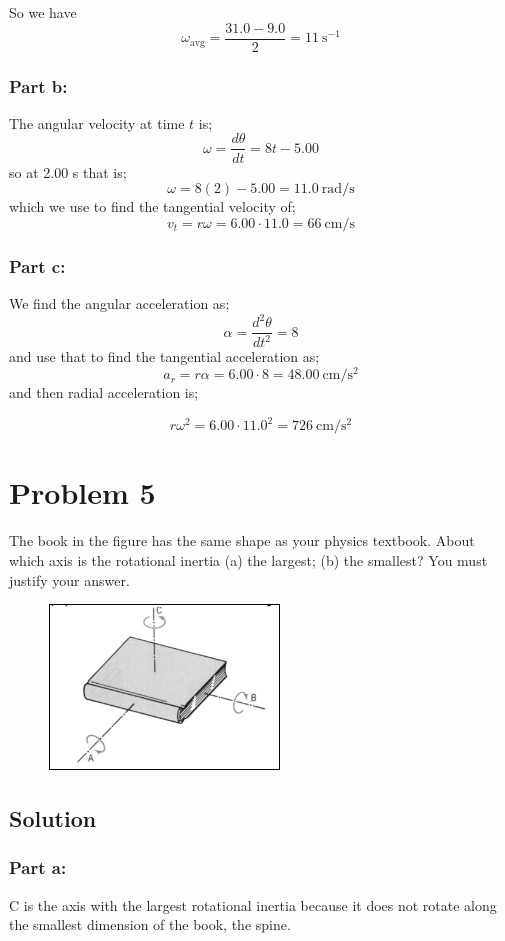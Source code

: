 \documentclass{article}
\begin{document}
So we have
\[
	\omega_\text{avg} = \frac{31.0-9.0}{2} = \boxed{11\ \text{s}^{-1}}
\]

\subsubsection*{Part b:}
The angular velocity at time $t$ is;
\[
	\omega = \frac{d\theta}{dt} = 8t - 5.00
\]
so at 2.00 s that is;
\[
	\omega = 8(2)-5.00 = 11.0\ \text{rad}/\text{s}
\]
which we use to find the tangential velocity of;
\[
	v_t = r \omega = 6.00 \cdot 11.0 = \boxed{66\ \text{cm}/\text{s}}
\]

\subsubsection*{Part c:}
We find the angular acceleration as;
\[
	\alpha = \frac{d^2\theta}{dt^2} = 8
\]
and use that to find the tangential acceleration as;
\[
	a_r = r \alpha = 6.00 \cdot 8 = \boxed{48.00\ \text{cm}/\text{s}^2}
\]
and then radial acceleration is;

\[
	r\omega^2 = 6.00 \cdot 11.0^2 = \boxed{726\ \text{cm}/\text{s}^2}
\]

\pagebreak

\section*{Problem 5}
The book in the figure has the same shape as your physics textbook. About which axis is the
rotational inertia (a) the largest; (b) the smallest? You must justify your answer.

\begin{figure}[ht]
    \centering
    \includegraphics[scale=0.5]{drawing-3.png}
\end{figure}

\subsection*{Solution}
\subsubsection*{Part a:}
C is the axis with the largest rotational inertia because it does not rotate along the smallest dimension of the book, the spine.
\end{document}
